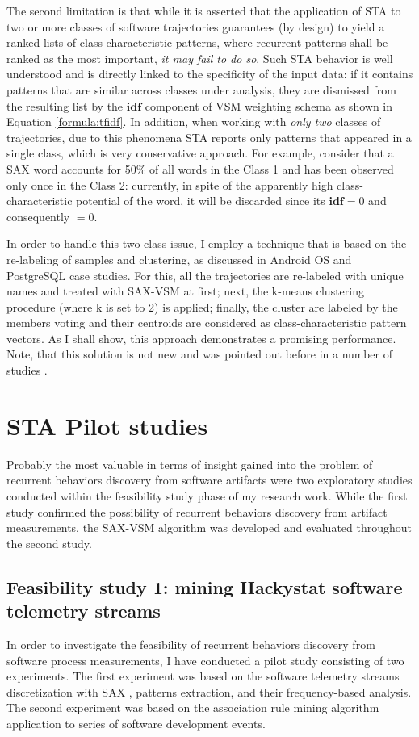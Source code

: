 The second limitation is that while it is asserted that the application of STA to two or more classes of software trajectories guarantees (by design) to yield a ranked lists of class-characteristic patterns, where recurrent patterns shall be ranked as the most important, \textit{it may fail to do so}. Such STA behavior is well understood and is directly linked to the specificity of the input data: if it contains patterns that are similar across classes under analysis, they are dismissed from the resulting list by the $\textbf{idf}$ component of VSM weighting schema as shown in Equation \eqref{formula:tfidf}. In addition, when working with \textit{only two} classes of trajectories, due to this phenomena STA reports only patterns that appeared in a single class, which is very conservative approach. For example, consider that a SAX word accounts for 50\% of all words in the Class 1 and has been observed only once in the Class 2: currently, in spite of the apparently high class-characteristic potential of the word, it will be discarded since its $\textbf{idf}=0$ and consequently \tfidf$=0$.

In order to handle this two-class issue, I employ a technique that is based on the re-labeling of samples and clustering, as discussed in Android OS and PostgreSQL case studies. For this, all the trajectories are re-labeled with unique names and treated with SAX-VSM at first; next, the k-means clustering procedure (where k is set to 2) is applied; finally, the cluster are labeled by the members voting and their centroids are considered as class-characteristic pattern vectors. As I shall show, this approach demonstrates a promising performance. Note, that this solution is not new and was pointed out before in a number of studies \cite{classification_centroids} \cite{salton-71} \cite{intro_ir_Manning}.

\section{STA Pilot studies}
Probably the most valuable in terms of insight gained into the problem of recurrent behaviors discovery from software artifacts were two exploratory studies conducted within the feasibility study phase of my research work. While the first study confirmed the possibility of recurrent behaviors discovery from artifact measurements, the SAX-VSM algorithm was developed and evaluated throughout the second study.

\subsection{Feasibility study 1: mining Hackystat software telemetry streams}
In order to investigate the feasibility of recurrent behaviors discovery from software process measurements, I have conducted a pilot study consisting of two experiments. The first experiment was based on the software telemetry streams discretization with SAX \cite{citeulike:2821475}, patterns extraction, and their frequency-based analysis. The second experiment was based on the association rule mining algorithm application to series of software development events.

